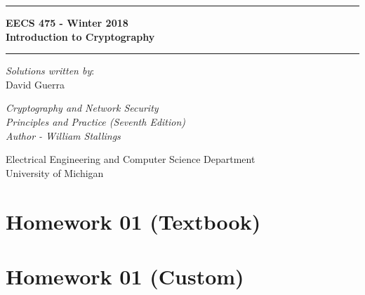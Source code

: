 \documentclass[answers]{exam}  %
\begin{document}
\begin{titlepage}
	\begin{center}
		\vspace*{4cm}

		\hrule
		\vspace{0.5cm}
		{ 
			\LARGE 
			\textbf{EECS 475 - Winter 2018}\\
			\textbf{Introduction to Cryptography}
		}
		\vspace{0.5cm}
		\hrule

		\vspace{2cm}

		\textit{Solutions written by}:\\
		{\large David Guerra}

		\vfill

		{ \Large \textit{Cryptography and Network Security}\\ }
		{ \Large \textit{Principles and Practice (Seventh Edition)}\\ }
		{ \Large \textit{Author - William Stallings} }

		\vspace{2cm}

		\Large
		Electrical Engineering and Computer Science Department\\
		University of Michigan

	\end{center}
\end{titlepage}
\newpage

\tableofcontents
\newpage

\section{Homework 01 (Textbook)}

\newpage

\section{Homework 01 (Custom)}

\newpage

% 

% 
\end{document}
